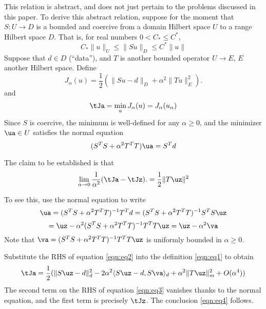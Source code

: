 This relation is abstract, and does not just pertain to the problems
discussed in this paper. To derive this abstract relation, suppose for
the moment that $S:U \rightarrow D$ is a bounded and coercive from a
domain Hilbert space $U$ to a range Hilbert space $D$. That is, for
real numbers $0 < C_* \le C^*$,
\[
  C_*\|u\|_U \le \|Su\|_D \le C^*\|u\|
\]
Suppose that $d \in D$ (``data''), and $T$ is another bounded operator $U \rightarrow E$, $E$
another Hilbert space. Define
\begin{equation}
  \label{eqn:eq1}
  J_{\alpha}(u) = \frac{1}{2}(\|Su-d\|_D + \alpha^2\|Tu\|_E^2).
\end{equation}
and
\begin{equation}
  \label{eqn:eq0}
  \tJa= \min_u J_{\alpha}(u) = J_{\alpha}(u_{\alpha})
\end{equation}
Since $S$ is coercive, the minimum is well-defined for any
$\alpha \ge 0$, and the minimizer $\ua \in U$ satisfies the normal
equation
\begin{equation}
  \label{eqn:eq0n}
  (S^TS + \alpha^2 T^TT) \ua = S^Td
\end{equation}

The claim to be established is that
\begin{equation}
  \label{eqn:eq4}
  \lim_{\alpha \rightarrow 0} \frac{1}{\alpha^2}  (\tJa-\tJz).= \frac{1}{2}\|T\uz\|^2
\end{equation}

To see this, use the normal equation to write
\[
  \ua = (S^TS + \alpha^2 T^TT)^{-1}T^Td = (S^TS + \alpha^2 T^TT)^{-1}S^TS \uz
\]
\begin{equation}
  \label{eqn:eq2}
  = \uz - \alpha^2 (S^TS + \alpha^2 T^TT)^{-1}T^TT\uz = \uz-\alpha^2 \va
\end{equation}
Note that $\va = (S^TS + \alpha^2 T^TT)^{-1}T^TT\uz$ is uniformly bounded in $\alpha \ge 0$.

Substitute the RHS of equation \ref{eqn:eq2} into the definition \ref{eqn:eq1} to obtain
\begin{equation}
  \label{eqn:eq3}
  \tJa = \frac{1}{2}(\|S\uz-d\|_d^2 - 2 \alpha^2\langle S\uz-d, S\va\rangle_d + \alpha^2\|T\uz\|_m^2 + O(\alpha^4))
\end{equation}
The second term on the RHS of equation \ref{eqn:eq3} vanishes thanks to the normal equation, and the first term is precisely $\tJz$. The conclusion \ref{eqn:eq4} follows.

